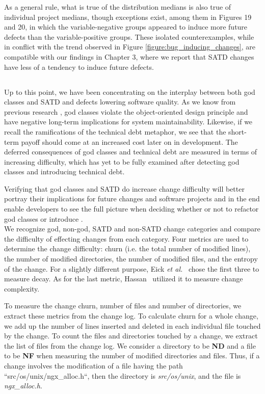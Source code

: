 As a general rule, what is true of the distribution medians is also true of individual project medians, though exceptions exist, among them  in Figures 19 and 20, in which the variable-negative groups appeared to induce more future defects than the variable-positive groups. These isolated counterexamples, while in conflict with the trend observed in Figure \ref{figure:bug_inducing_changes}, are compatible with our findings in Chapter 3, where we report that SATD changes have less of a tendency to induce future defects.

\subsection*{\chapterIVrqIII}

Up to this point, we have been concentrating on the interplay between both god classes and SATD and defects lowering software quality. As we know from previous research \cite{marinescu2004detection}, god classes violate the object-oriented design principle and have negative long-term implications for system maintainability. Likewise, if we recall the ramifications of the technical debt metaphor, we see that the short-term payoff should come at an increased cost later on in development. The deferred consequences of god classes and technical debt are measured in terms of increasing difficulty, which has yet to be fully examined after detecting god classes and introducing technical debt.


Verifying that god classes and SATD do increase change difficulty will better portray their implications for future changes and software projects and in the end enable developers to see the full picture when deciding whether or not to refactor god classes or introduce \SATD. \\

We recognize god, non-god, SATD and non-SATD change categories and compare the difficulty of effecting changes from each category. Four metrics are used to determine the change difficulty: churn (i.e. the total number of modified lines), the number of modified directories, the number of modified files, and the entropy of the change. For a slightly different purpose, Eick \emph{et al.}~\cite{eick2001decay} chose the first three to measure decay. As for the last metric, Hassan~\cite{hassan2009predicting} utilized it to measure change complexity.


To measure the change churn, number of files and number of directories, we extract these metrics from the change log. To calculate churn for a whole change, we add up the number of lines inserted and deleted in each individual file touched by the change. To count the files and directories touched by a change, we extract the list of files from the change log. We consider a directory to be \textbf{ND} and a file to be \textbf{NF} when measuring the number of modified directories and files. Thus, if a change involves the modification of a file having the path ``src/os/unix/ngx\_alloc.h``, then the directory is \textit{src/os/unix}, and the file is \textit{ngx\_alloc.h}.\\



